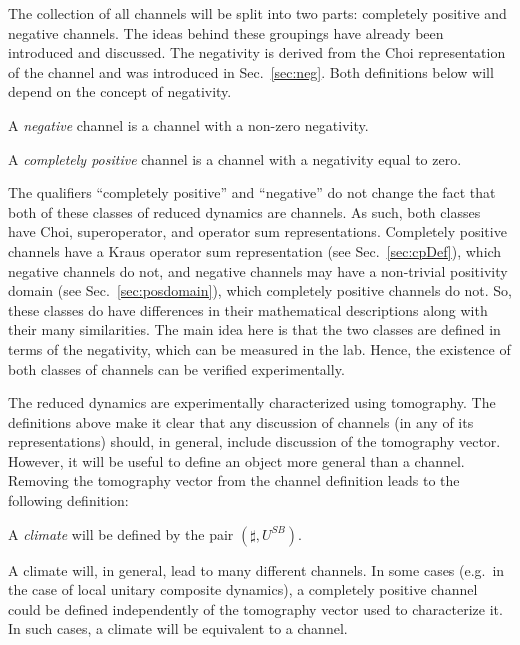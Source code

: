 The collection of all channels will be split into two parts: completely positive and negative channels.  The ideas behind these groupings have already been introduced and discussed.  The negativity is derived from the Choi representation of the channel and was introduced in Sec.\ \ref{sec:neg}.  Both definitions below will depend on the concept of negativity.

\begin{definition}
A {\em negative} channel is a channel with a non-zero negativity.  
\end{definition}  

\begin{definition}
A {\em completely positive} channel is a channel with a negativity equal to zero.  
\end{definition}  

The qualifiers ``completely positive'' and ``negative'' do not change the fact that both of these classes of reduced dynamics are channels.  As such, both classes have Choi, superoperator, and operator sum representations.  Completely positive channels have a Kraus operator sum representation (see Sec.\ \ref{sec:cpDef}), which negative channels do not, and negative channels may have a non-trivial positivity domain (see Sec.\ \ref{sec:posdomain}), which completely positive channels do not.  So, these classes do have differences in their mathematical descriptions along with their many similarities.  The main idea here is that the two classes are defined in terms of the negativity, which can be measured in the lab.  Hence, the existence of both classes of channels can be verified experimentally.  

The reduced dynamics are experimentally characterized using tomography.  The definitions above make it clear that any discussion of channels (in any of its representations) should, in general, include discussion of the tomography vector.  However, it will be useful to define an object more general than a channel.  Removing the tomography vector from the channel definition leads to the following definition:

\begin{definition}
A {\em climate} will be defined by the pair $(\sharp,U^{SB})$.
\end{definition}
A climate will, in general, lead to many different channels.  In some cases (e.g.\ in the case of local unitary composite dynamics), a completely positive channel could be defined independently of the tomography vector used to characterize it.  In such cases, a climate will be equivalent to a channel.

